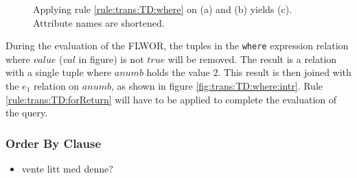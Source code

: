 \begin{myExample}
\begin{figure}[h]
\caption[Example: Evaluation of where clause]{Applying rule \ref{rule:trans:TD:where} on (a) and (b)
yields (c). Attribute names are shortened. \label{fig:trans:TD:whereClause}}
\end{figure}
During the evaluation of the FLWOR, the tuples in the \texttt{where} expression relation where $value$ ($val$ in
figure) is not $true$ will be removed. The result is a relation with a single tuple where $anumb$ holds the value
$2$. This result is then joined with the $e_1$ relation on $anumb$, as shown in figure
\ref{fig:trans:TD:where:intr}. Rule \ref{rule:trans:TD:forReturn} will have to be applied to complete the
evaluation of the query.
\end{myExample}


\subsubsection{Order By Clause}
\begin{itemize}
  \item vente litt med denne?
\end{itemize}

